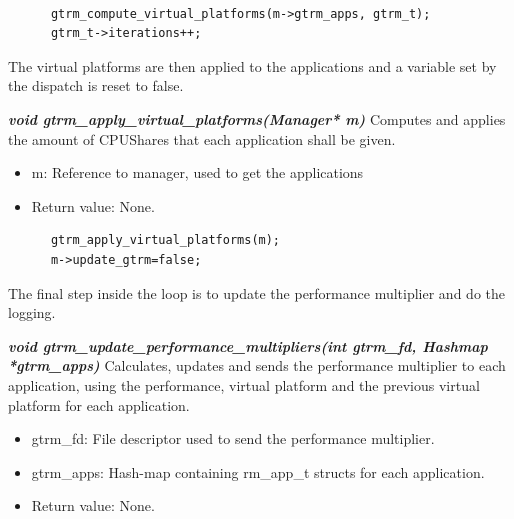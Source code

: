 \documentclass[nobiblatex]{LTHthesis}
\begin{document}
\begin{verbatim}

      gtrm_compute_virtual_platforms(m->gtrm_apps, gtrm_t);
      gtrm_t->iterations++;
\end{verbatim}
The virtual platforms are then applied to the applications and a variable set by the dispatch is reset to false.
\begin{framed}
		\begin{flushleft}
				\textbf{\emph{{void gtrm\_apply\_virtual\_platforms(Manager* m)}}} \newline
				Computes and applies the amount of CPUShares that each application shall be given.
				\begin{itemize}
				\item m: Reference to manager, used to get the applications
				\item Return value: None.
				\end{itemize}
		\end{flushleft}	
\end{framed}
\begin{verbatim}
      gtrm_apply_virtual_platforms(m); 
      m->update_gtrm=false;																	
\end{verbatim}
The final step inside the loop is to update the performance multiplier and do the logging.
\begin{framed}
		\begin{flushleft}
				\textbf{\emph{{void gtrm\_update\_performance\_multipliers(int gtrm\_fd, Hashmap *gtrm\_apps)}}} \newline
				Calculates, updates and sends the performance multiplier to each application, using the performance, virtual platform and the previous virtual platform for each application.
				\begin{itemize} 
				\item gtrm\_fd: File descriptor used to send the performance multiplier.
				\item gtrm\_apps: Hash-map containing rm\_app\_t structs for each application.
				\item Return value: None.
				\end{itemize}

		\end{flushleft}	
\end{framed}
\end{document}
